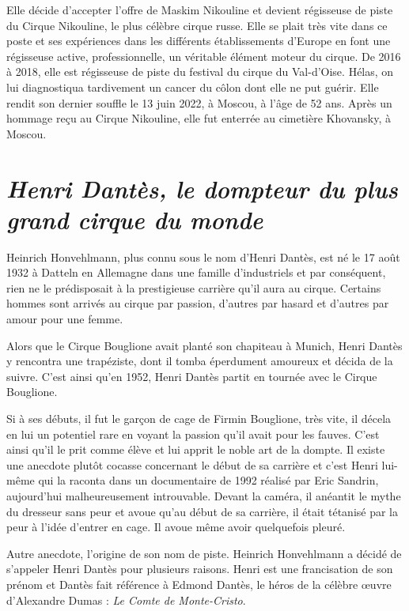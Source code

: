 Elle décide d’accepter l’offre de Maskim Nikouline et devient régisseuse de piste du Cirque Nikouline, le plus célèbre cirque russe. Elle se plait très vite dans ce poste et ses expériences dans les différents établissements d’Europe en font une régisseuse active, professionnelle, un véritable élément moteur du cirque. De 2016 à 2018, elle est régisseuse de piste du festival du cirque du Val-d'Oise. Hélas, on lui diagnostiqua tardivement un cancer du côlon dont elle ne put guérir. Elle rendit son dernier souffle le 13 juin 2022, à Moscou, à l'âge de 52 ans. Après un hommage reçu au Cirque Nikouline, elle fut enterrée au cimetière Khovansky, à Moscou.

\section*{\textit{Henri Dantès, le dompteur du plus grand cirque du monde }}
{}
\noindent
Heinrich Honvehlmann, plus connu sous le nom d’Henri Dantès, est né le 17 août 1932 à Datteln en Allemagne dans une famille d’industriels et par conséquent, rien ne le prédisposait à la prestigieuse carrière qu’il aura au cirque. Certains hommes sont arrivés au cirque par passion, d’autres par hasard et d’autres par amour pour une femme.

Alors que le Cirque Bouglione avait planté son chapiteau à Munich, Henri Dantès y rencontra une trapéziste, dont il tomba éperdument amoureux et décida de la suivre. C’est ainsi qu’en 1952, Henri Dantès partit en tournée avec le Cirque Bouglione.

Si à ses débuts, il fut le garçon de cage de Firmin Bouglione, très vite, il décela en lui un potentiel rare en voyant la passion qu’il avait pour les fauves. C’est ainsi qu'il le prit comme élève et lui apprit le noble art de la dompte. Il existe une anecdote plutôt cocasse concernant le début de sa carrière et c’est Henri lui-même qui la raconta dans un documentaire de 1992 réalisé par Eric Sandrin, aujourd’hui malheureusement introuvable. Devant la caméra, il anéantit le mythe du dresseur sans peur et avoue qu’au début de sa carrière, il était tétanisé par la peur à l’idée d’entrer en cage. Il avoue même avoir quelquefois pleuré.

Autre anecdote, l’origine de son nom de piste. Heinrich Honvehlmann a décidé de s’appeler Henri Dantès pour plusieurs raisons. Henri est une francisation de son prénom et Dantès fait référence à Edmond Dantès, le héros de la célèbre œuvre d'Alexandre Dumas : \textit{Le Comte de Monte-Cristo}.

